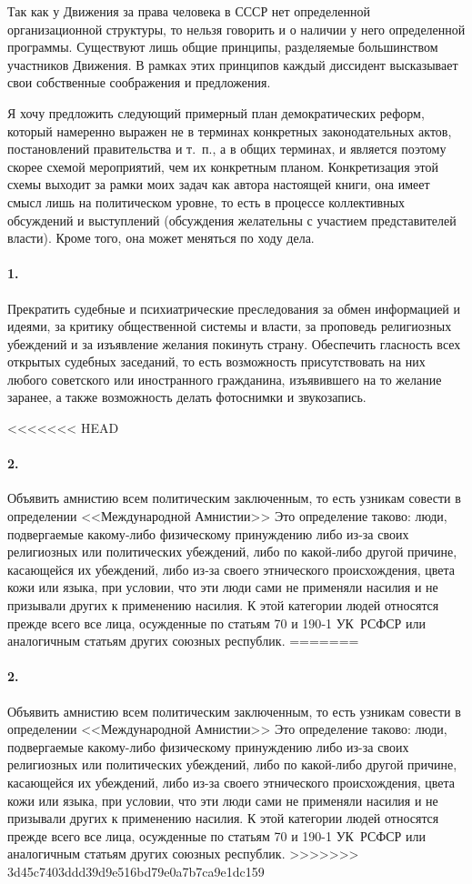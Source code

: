 \documentclass{book}
\begin{document}
Так как у Движения за права человека в СССР нет определен­ной организационной структуры, то нельзя говорить и о нали­чии у него определенной программы. Существуют лишь общие принципы, разделяемые большинством участников Движения. В рамках этих принципов каждый диссидент высказывает свои собственные соображения и предложения.

Я хочу предложить следующий примерный план демократи­ческих реформ, который намеренно выражен не в терминах конкретных законодательных актов, постановлений прави­тельства и т.~п., а в общих терминах, и является поэтому ско­рее схемой мероприятий, чем их конкретным планом. Конкре­тизация этой схемы выходит за рамки моих задач как автора настоящей книги, она имеет смысл лишь на политическом уровне, то есть в процессе коллективных обсуждений и вы­ступлений (обсуждения желательны с участием представите­лей власти). Кроме того, она может меняться по ходу дела.

\paragraph{1.} Прекратить судебные и психиатрические преследования за обмен информацией и идеями, за критику общественной системы и власти, за проповедь религиозных убеждений и за изъявление желания покинуть страну. Обеспечить гласность всех открытых судебных заседаний, то есть возможность при­сутствовать на них любого советского или иностранного граж­данина, изъявившего на то желание заранее, а также возмож­ность делать фотоснимки и звукозапись.

<<<<<<< HEAD
\paragraph{2.} Объявить амнистию всем политическим заключенным, то есть узникам совести  в определении <<Международной Амнистии>> Это определение таково: люди, подвергаемые какому‑либо физическому принуждению либо из‑за своих религиоз­ных или политических убеждений, либо по какой‑либо другой причине, касающейся их убеждений, либо из‑за своего этниче­ского происхождения, цвета кожи или языка, при условии, что эти люди сами не применяли насилия и не призывали дру­гих к применению насилия. К этой категории людей относят­ся прежде всего все лица, осужденные по статьям 70 и 190‑1 УК~РСФСР или аналогичным статьям других союзных респуб­лик.
=======
\paragraph{2.} Объявить амнистию всем политическим заключенным, то есть узникам совести  в определении <<Международной Амнистии>> Это определение таково: люди, подвергаемые какому-либо физическому принуждению либо из-за своих религиоз­ных или политических убеждений, либо по какой-либо другой причине, касающейся их убеждений, либо из-за своего этниче­ского происхождения, цвета кожи или языка, при условии, что эти люди сами не применяли насилия и не призывали дру­гих к применению насилия. К этой категории людей относят­ся прежде всего все лица, осужденные по статьям 70 и 190-1 УК~РСФСР или аналогичным статьям других союзных респуб­лик.
>>>>>>> 3d45c7403ddd39d9e516bd79e0a7b7ca9e1dc159
\end{document}
